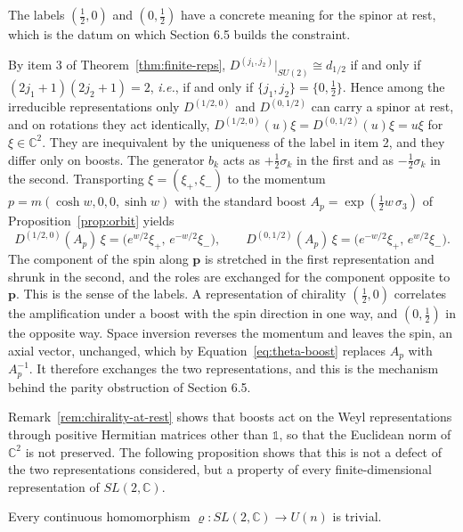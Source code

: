 The labels $(\frac12,0)$ and $(0,\frac12)$ have a concrete meaning for the spinor at rest, which is the datum on which Section 6.5 builds the constraint.

\begin{remark}\label{rem:chirality-at-rest}
	By item 3 of Theorem~\ref{thm:finite-reps}, $D^{(j_1,j_2)}|_{SU(2)}\cong d_{1/2}$ if and only if $(2j_1+1)(2j_2+1)=2$, \textit{i.e.}, if and only if $\{j_1,j_2\}=\{0,\tfrac12\}$. Hence among the irreducible representations only $D^{(1/2,0)}$ and $D^{(0,1/2)}$ can carry a spinor at rest, and on rotations they act identically, $D^{(1/2,0)}(u)\xi=D^{(0,1/2)}(u)\xi=u\xi$ for $\xi\in\mathbb{C}^2$. They are inequivalent by the uniqueness of the label in item 2, and they differ only on boosts. The generator $b_k$ acts as $+\tfrac12\sigma_k$ in the first and as $-\tfrac12\sigma_k$ in the second. Transporting $\xi=(\xi_+,\xi_-)$ to the momentum $p=m(\cosh w,0,0,\sinh w)$ with the standard boost $A_p=\exp(\tfrac12w\,\sigma_3)$ of Proposition~\ref{prop:orbit} yields
	\begin{equation*}
		D^{(1/2,0)}(A_p)\,\xi=\big(e^{w/2}\xi_+,\,e^{-w/2}\xi_-\big),\qquad D^{(0,1/2)}(A_p)\,\xi=\big(e^{-w/2}\xi_+,\,e^{w/2}\xi_-\big).
	\end{equation*}
	The component of the spin along $\mathbf{p}$ is stretched in the first representation and shrunk in the second, and the roles are exchanged for the component opposite to $\mathbf{p}$. This is the sense of the labels. A representation of chirality $(\frac12,0)$ correlates the amplification under a boost with the spin direction in one way, and $(0,\frac12)$ in the opposite way. Space inversion reverses the momentum and leaves the spin, an axial vector, unchanged, which by Equation~\eqref{eq:theta-boost} replaces $A_p$ with $A_p^{-1}$. It therefore exchanges the two representations, and this is the mechanism behind the parity obstruction of Section 6.5.
\end{remark}

Remark~\ref{rem:chirality-at-rest} shows that boosts act on the Weyl representations through positive Hermitian matrices other than $\mathbb{1}$, so that the Euclidean norm of $\mathbb{C}^2$ is not preserved. The following proposition shows that this is not a defect of the two representations considered, but a property of every finite-dimensional representation of $SL(2,\mathbb{C})$.

\begin{proposition}\label{prop:no-unitary}
	Every continuous homomorphism $\varrho\colon SL(2,\mathbb{C})\to U(n)$ is trivial.
\end{proposition}

